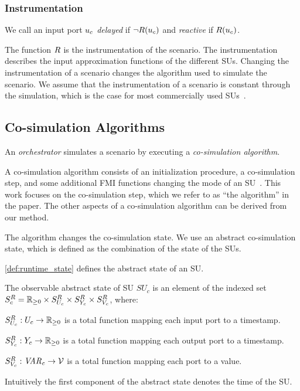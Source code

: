 \subsubsection{Instrumentation}
We call an input port $u_{c}$ \emph{delayed} if $\neg R(u_{c})$ and \emph{reactive} if $R(u_{c})$. 

The function $R$ is the instrumentation of the scenario.
The instrumentation describes the input approximation functions of the different SUs.
Changing the instrumentation of a scenario changes the algorithm used to simulate the scenario.
We assume that the instrumentation of a scenario is constant through the simulation, which is the case for most commercially used SUs~\cite{Gomes2018a}.

\subsection{Co-simulation Algorithms}\label{sc:cosimalgo}
An \emph{orchestrator} simulates a scenario by executing a \emph{co-simulation algorithm}.

A co-simulation algorithm consists of an initialization procedure, a co-simulation step, and some additional FMI functions changing the mode of an SU~\cite{FMI2014}.
This work focuses on the co-simulation step, which we refer to as ``the algorithm'' in the paper. 
The other aspects of a co-simulation algorithm can be derived from our method.  

The algorithm changes the co-simulation state. 
We use an abstract co-simulation state, which is defined as the combination of the state of the SUs.

\cref{def:runtime_state} defines the abstract state of an SU.

\begin{definition}\label{def:runtime_state}
  The observable abstract state of SU $SU_c$ is an element of the indexed set $S^{R}_{c} = \mathbb{R}_{\geq 0} \times S^{R}_{U_{c}} \times S^{R}_{Y_{c}} \times S^{R}_{V_c}$, where:
  \begin{compactitem}
    \item $S^{R}_{U_{c}} : U_{c} \to \mathbb{R}_{\geq 0}$ is a total function mapping each input port to a timestamp.  
    \item $S^{R}_{Y_{c}} : Y_{c} \to \mathbb{R}_{\geq 0}$ is a total function mapping each output port to a timestamp.  
    \item $S^{R}_{V_c} : \mathit{VAR_{c}} \to \mathcal{V}$ is a total function mapping each port to a value.  
  \end{compactitem}
  Intuitively the first component of the abstract state denotes the time of the SU.
\end{definition}

